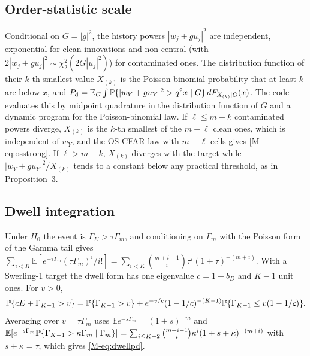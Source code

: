 \subsection{Order-statistic scale}
Conditional on $G=|g|^2$, the history powers $|w_j+gu_j|^2$ are independent, exponential for clean innovations and non-central (with $2|w_j+gu_j|^2\sim\chi^2_2(2G|u_j|^2)$) for contaminated ones. The distribution function of their $k$-th smallest value $X_{(k)}$ is the Poisson-binomial probability that at least $k$ are below $x$, and $P_{\rm d}=\mathbb E_G\int\mathbb{P}\{|w_Y+gu_Y|^2>q^2x\mid G\}\,dF_{X_{(k)}\mid G}(x)$. The code evaluates this by midpoint quadrature in the distribution function of $G$ and a dynamic program for the Poisson-binomial law. If $\ell\le m-k$ contaminated powers diverge, $X_{(k)}$ is the $k$-th smallest of the $m-\ell$ clean ones, which is independent of $w_Y$, and the OS-CFAR law with $m-\ell$ cells gives \eqref{M-eq:osstrong}. If $\ell>m-k$, $X_{(k)}$ diverges with the target while $|w_Y+gu_Y|^2/X_{(k)}$ tends to a constant below any practical threshold, as in Proposition~3.

\subsection{Dwell integration}
Under $H_0$ the event is $\Gamma_K>\tau\Gamma_m$, and conditioning on $\Gamma_m$ with the Poisson form of the Gamma tail gives $\sum_{i<K}\mathbb E[e^{-\tau\Gamma_m}(\tau\Gamma_m)^i/i!]=\sum_{i<K}\binom{m+i-1}{i}\tau^i(1+\tau)^{-(m+i)}$. With a Swerling-1 target the dwell form has one eigenvalue $c=1+b_D$ and $K-1$ unit ones. For $v>0$,
\[
\mathbb{P}\{cE+\Gamma_{K-1}>v\}=\mathbb{P}\{\Gamma_{K-1}>v\}+e^{-v/c}(1-1/c)^{-(K-1)}\mathbb{P}\{\Gamma_{K-1}\le v(1-1/c)\}.
\]
Averaging over $v=\tau\Gamma_m$ uses $\mathbb E e^{-s\Gamma_m}=(1+s)^{-m}$ and $\mathbb E[e^{-s\Gamma_m}\mathbb{P}\{\Gamma_{K-1}>\kappa\Gamma_m\mid\Gamma_m\}]=\sum_{i\le K-2}\binom{m+i-1}{i}\kappa^i(1+s+\kappa)^{-(m+i)}$ with $s+\kappa=\tau$, which gives \eqref{M-eq:dwellpd}.

